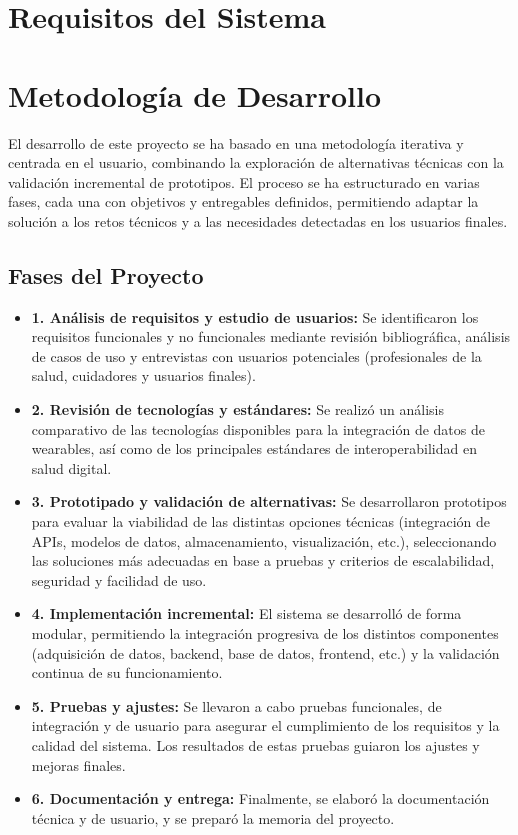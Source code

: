 \section{Requisitos del Sistema}


\section{Metodología de Desarrollo}

El desarrollo de este proyecto se ha basado en una metodología iterativa y centrada en el usuario, combinando la exploración de alternativas técnicas con la validación incremental de prototipos. El proceso se ha estructurado en varias fases, cada una con objetivos y entregables definidos, permitiendo adaptar la solución a los retos técnicos y a las necesidades detectadas en los usuarios finales.

\subsection{Fases del Proyecto}
\begin{itemize}
    \item \textbf{1. Análisis de requisitos y estudio de usuarios:} Se identificaron los requisitos funcionales y no funcionales mediante revisión bibliográfica, análisis de casos de uso y entrevistas con usuarios potenciales (profesionales de la salud, cuidadores y usuarios finales).
    \item \textbf{2. Revisión de tecnologías y estándares:} Se realizó un análisis comparativo de las tecnologías disponibles para la integración de datos de wearables, así como de los principales estándares de interoperabilidad en salud digital.
    \item \textbf{3. Prototipado y validación de alternativas:} Se desarrollaron prototipos para evaluar la viabilidad de las distintas opciones técnicas (integración de APIs, modelos de datos, almacenamiento, visualización, etc.), seleccionando las soluciones más adecuadas en base a pruebas y criterios de escalabilidad, seguridad y facilidad de uso.
    \item \textbf{4. Implementación incremental:} El sistema se desarrolló de forma modular, permitiendo la integración progresiva de los distintos componentes (adquisición de datos, backend, base de datos, frontend, etc.) y la validación continua de su funcionamiento.
    \item \textbf{5. Pruebas y ajustes:} Se llevaron a cabo pruebas funcionales, de integración y de usuario para asegurar el cumplimiento de los requisitos y la calidad del sistema. Los resultados de estas pruebas guiaron los ajustes y mejoras finales.
    \item \textbf{6. Documentación y entrega:} Finalmente, se elaboró la documentación técnica y de usuario, y se preparó la memoria del proyecto.
\end{itemize}

